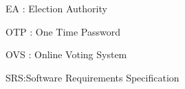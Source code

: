 \documentclass[12pt,a4paper,oneside]{report}
\begin{document}
\vspace{.1 in }
\begin{flushleft}
EA \hspace{1.6 in}:\hspace{.1 in} Election Authority\\ 
\end{flushleft}
 \begin{flushleft}
 OTP \hspace{1.5 in}:\hspace{.1 in} One Time Password\\
 \end{flushleft}
\begin{flushleft}
OVS \hspace{1.5 in}:\hspace{.1 in} Online Voting System\\
\end{flushleft}
\begin{flushleft}
SRS\hspace{1.6 in}:\hspace{.1 in}Software Requirements Specification\\
\end{flushleft}

 

 \vspace{.1 in }
\hspace{.3 in} 
\end{document}
